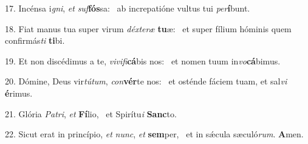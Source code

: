 17. Incénsa i\textit{gni}, \textit{et} \textit{suf}\textbf{fós}sa: \ast\  ab increpatióne vultus tui \textit{per}\textbf{í}bunt.\

18. Fiat manus tua super virum \textit{déx}\textit{te}\textit{ræ} \textbf{tu}æ: \ast\  et super fílium hóminis quem confirmás\textit{ti} \textbf{ti}bi.\

19. Et non discédimus a te, \textit{vi}\textit{vi}\textit{fi}\textbf{cá}bis nos: \ast\  et nomen tuum in\textit{vo}\textbf{cá}bimus.\

20. Dómine, Deus vir\textit{tú}\textit{tum}, \textit{con}\textbf{vér}te nos: \ast\  et osténde fáciem tuam, et sal\textit{vi} \textbf{é}rimus.\

21. Glória \textit{Pa}\textit{tri}, \textit{et} \textbf{Fí}lio, \ast\  et Spirítu\textit{i} \textbf{Sanc}to.\

22. Sicut erat in princípio, \textit{et} \textit{nunc}, \textit{et} \textbf{sem}per, \ast\  et in sǽcula sæculó\textit{rum}. \textbf{A}men.\

